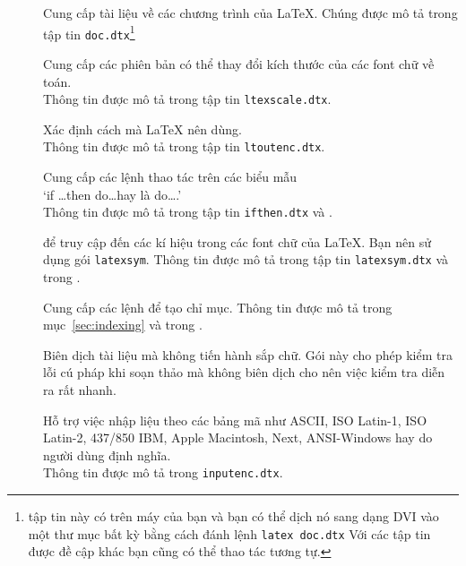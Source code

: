 \begin{table}[!hbtp]
\caption{ Một số gói được phân phối chúng với \LaTeX{}.}
\label{packages}
\begin{lined}{11cm}
\begin{description}
\item[\normalfont{}]  Cung cấp tài liệu về các chương trình của \LaTeX{}. Chúng được mô tả trong tập tin \texttt{doc.dtx}\footnote{ tập tin này có trên máy của bạn và bạn có thể dịch nó sang dạng DVI vào một thư mục bất kỳ bằng cách đánh lệnh \texttt{latex doc.dtx} Với các tập tin được đề cập khác bạn cũng có thể thao tác tương tự.}

\item[\normalfont{}] Cung cấp các phiên bản có thể thay đổi kích thước của các font chữ về toán.\\
  Thông tin được mô tả trong tập tin \texttt{ltexscale.dtx}.

\item[\normalfont{}] Xác định cách  mà \LaTeX{} nên dùng.\\
  Thông tin được mô tả trong tập tin \texttt{ltoutenc.dtx}.

\item[\normalfont{}] Cung cấp các lệnh thao tác trên các biểu mẫu\\ 
  `if \ldots then  do\ldots hay là do\ldots.'\\ Thông tin được mô
  tả trong tập tin \texttt{ifthen.dtx} và \companion.

\item[\normalfont{}] để truy cập đến các kí hiệu trong các font chữ của \LaTeX{}. Bạn nên sử dụng gói \texttt{latexsym}. Thông tin được mô tả trong tập tin \texttt{latexsym.dtx} và trong
\companion.

\item[\normalfont{}] Cung cấp các lệnh để tạo chỉ mục. Thông tin được mô tả trong mục~\ref{sec:indexing} và trong \companion.

\item[\normalfont{}] Biên dịch tài liệu mà không tiến hành sắp chữ. Gói này cho phép kiểm tra lỗi cú pháp khi soạn thảo mà không biên dịch cho nên việc kiểm tra diễn ra rất nhanh.

\item[\normalfont{}] Hỗ trợ việc nhập liệu theo các bảng mã như ASCII, ISO Latin-1, ISO Latin-2, 437/850 IBM, Apple Macintosh, Next, ANSI-Windows hay do người dùng định nghĩa.\\
Thông tin được mô tả trong \texttt{inputenc.dtx}.
\end{description}
\end{lined}
\end{table}

